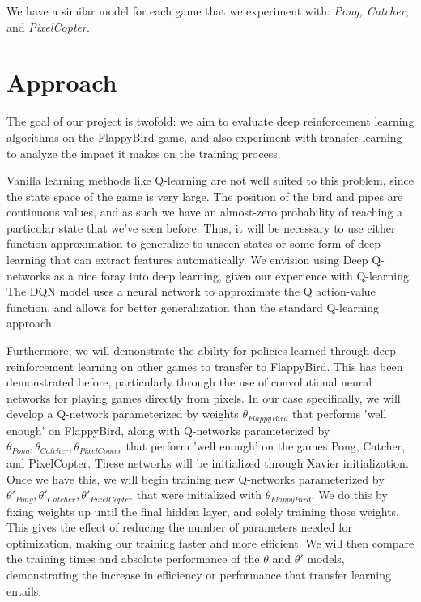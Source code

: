 \documentclass{article}
\begin{document}
We have a similar model for each game that we experiment with: \textit{Pong, Catcher}, and \textit{PixelCopter}.

\section{Approach}

The goal of our project is twofold: we aim to evaluate deep reinforcement learning algorithms on the FlappyBird game, and also experiment with transfer learning to analyze the impact it makes on the training process. 

Vanilla learning methods like Q-learning are not well suited to this problem, since the state space of the game is very large. The position of the bird and pipes are continuous values, and as such we have an almost-zero probability of reaching a particular state that we've seen before.
Thus, it will be necessary to use either function approximation to generalize to unseen states or some form of deep learning that can extract features automatically.
We envision using Deep Q-networks as a nice foray into deep learning, given our experience with Q-learning.
The DQN model uses a neural network to approximate the Q action-value function, and allows for better generalization than the standard Q-learning approach.

Furthermore, we will demonstrate the ability for policies learned through deep reinforcement learning on  other games to transfer to FlappyBird.
This has been demonstrated before, particularly through the use of convolutional neural networks for playing games directly from pixels. \cite{deepmind}
In our case specifically, we will develop a Q-network parameterized by weights $\theta_{FlappyBird}$ that performs 'well enough' on FlappyBird, along with Q-networks parameterized by $\theta_{Pong}, \theta_{Catcher}, \theta_{PixelCopter}$ that perform 'well enough' on the games Pong, Catcher, and PixelCopter.
These networks will be initialized through Xavier initialization. \cite{xavier}
Once we have this, we will begin training new Q-networks parameterized by $\theta'_{Pong}, \theta'_{Catcher}, \theta'_{PixelCopter}$ that were initialized with $\theta_{FlappyBird}$.
We do this by fixing weights up until the final hidden layer, and solely training those weights.
This gives the effect of reducing the number of parameters needed for optimization, making our training faster and more efficient.
We will then compare the training times and absolute performance of the $\theta$ and $\theta'$ models, demonstrating the increase in efficiency or performance that transfer learning entails.
\end{document}
